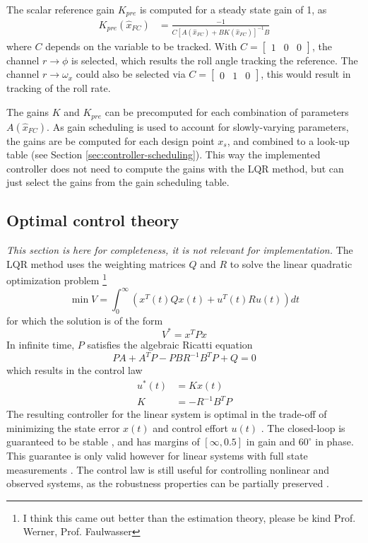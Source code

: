 The scalar reference gain $K_{pre}$ is computed for a steady state gain of 1, as
\begin{align}
    K_{pre} (\hat x_{FC}) &=  \frac{-1}{C \left[ A(\hat x_{FC}) + B K(\hat x_{FC}) \right]^{-1} B}
\end{align}
where $C$ depends on the variable to be tracked. 
With $C = \begin{bmatrix} 1 & 0 & 0 \end{bmatrix}$, the channel $r \to \phi$ is selected, which results the roll angle tracking the reference.
The channel $r \to \omega_x$ could also be selected via $C = \begin{bmatrix} 0 & 1 & 0 \end{bmatrix}$, this would result in tracking of the roll rate.

The gains $K$ and $K_{pre}$ can be precomputed for each combination of parameters $A(\hat x_{FC})$.
As gain scheduling is used to account for slowly-varying parameters, the gains are be computed for each design point $x_s$, and combined to a look-up table (see Section \ref{sec:controller-scheduling}).
This way the implemented controller does not need to compute the gains with the LQR method, but can just select the gains from the gain scheduling table. 

\subsection{Optimal control theory}
\label{sec:controller-theory}
\textit{This section is here for completeness, it is not relevant for implementation.}
The LQR method uses the weighting matrices $Q$ and $R$ to solve the linear quadratic optimization problem \cite{werner2021b} \footnote{I think this came out better than the estimation theory, please be kind Prof. Werner, Prof. Faulwasser}
\begin{equation}
    \min V = \int_0^{\infty} (x^T(t) Q x(t) + u^T(t) R u(t)) dt
\end{equation}
for which the solution is of the form 
\begin{equation}
    V^* = x^T P x
\end{equation}
In infinite time, $P$ satisfies the algebraic Ricatti equation 
\begin{equation}
    PA + A^TP - PBR^{-1}B^TP + Q = 0
\end{equation}
which results in the control law
\begin{align}
    u^*(t) &= K x(t) \\
    K &= -R^{-1}B^TP
\end{align}
The resulting controller for the linear system is optimal in the trade-off of minimizing the state error $x(t)$ and control effort $u(t)$ \cite{werner2021}.
The closed-loop is guaranteed to be stable \cite{werner2021b}, and has margins of $[\infty, 0.5]$ in gain and $60^\circ$ in phase. 
This guarantee is only valid however for linear systems with full state measurements \cite{doyle1978}.
The control law is still useful for controlling nonlinear and observed systems, as the robustness properties can be partially preserved \cite{werner2021b}.

